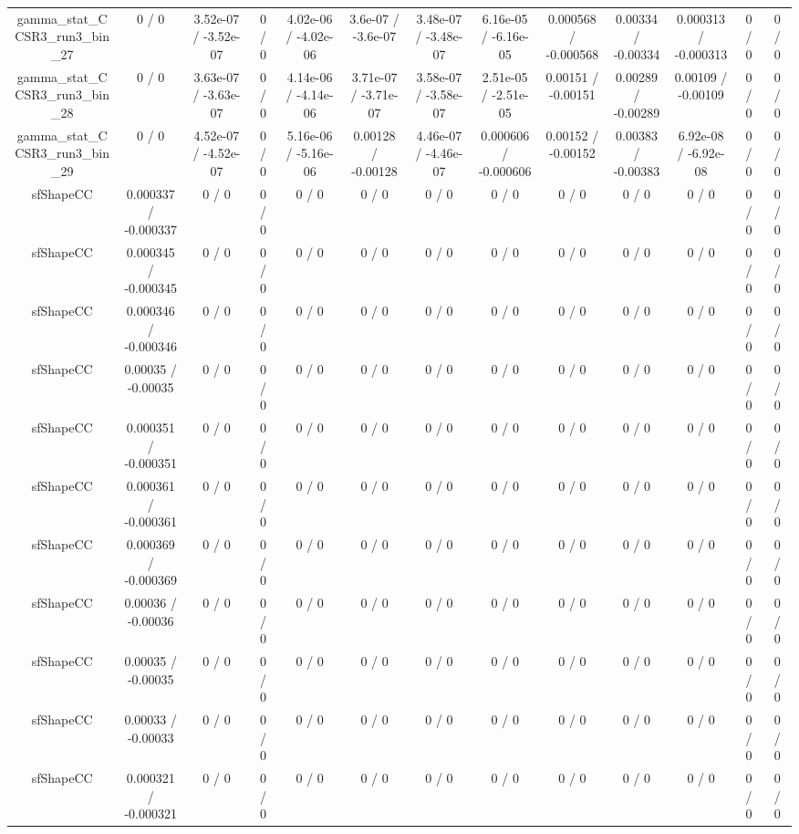 \documentclass[10pt]{article}
\begin{document}
\begin{table}[htbp]
\begin{center}
\begin{tabular}{|c|c|c|c|c|c|c|c|c|c|c|c|c|}
  gamma_stat_CCSR3_run3_bin_27 & 0 / 0 & 3.52e-07 / -3.52e-07 & 0 / 0 & 4.02e-06 / -4.02e-06 & 3.6e-07 / -3.6e-07 & 3.48e-07 / -3.48e-07 & 6.16e-05 / -6.16e-05 & 0.000568 / -0.000568 & 0.00334 / -0.00334 & 0.000313 / -0.000313 & 0 / 0 & 0 / 0 \\ 
  gamma_stat_CCSR3_run3_bin_28 & 0 / 0 & 3.63e-07 / -3.63e-07 & 0 / 0 & 4.14e-06 / -4.14e-06 & 3.71e-07 / -3.71e-07 & 3.58e-07 / -3.58e-07 & 2.51e-05 / -2.51e-05 & 0.00151 / -0.00151 & 0.00289 / -0.00289 & 0.00109 / -0.00109 & 0 / 0 & 0 / 0 \\ 
  gamma_stat_CCSR3_run3_bin_29 & 0 / 0 & 4.52e-07 / -4.52e-07 & 0 / 0 & 5.16e-06 / -5.16e-06 & 0.00128 / -0.00128 & 4.46e-07 / -4.46e-07 & 0.000606 / -0.000606 & 0.00152 / -0.00152 & 0.00383 / -0.00383 & 6.92e-08 / -6.92e-08 & 0 / 0 & 0 / 0 \\ 
  sfShapeCC & 0.000337 / -0.000337 & 0 / 0 & 0 / 0 & 0 / 0 & 0 / 0 & 0 / 0 & 0 / 0 & 0 / 0 & 0 / 0 & 0 / 0 & 0 / 0 & 0 / 0 \\ 
  sfShapeCC & 0.000345 / -0.000345 & 0 / 0 & 0 / 0 & 0 / 0 & 0 / 0 & 0 / 0 & 0 / 0 & 0 / 0 & 0 / 0 & 0 / 0 & 0 / 0 & 0 / 0 \\ 
  sfShapeCC & 0.000346 / -0.000346 & 0 / 0 & 0 / 0 & 0 / 0 & 0 / 0 & 0 / 0 & 0 / 0 & 0 / 0 & 0 / 0 & 0 / 0 & 0 / 0 & 0 / 0 \\ 
  sfShapeCC & 0.00035 / -0.00035 & 0 / 0 & 0 / 0 & 0 / 0 & 0 / 0 & 0 / 0 & 0 / 0 & 0 / 0 & 0 / 0 & 0 / 0 & 0 / 0 & 0 / 0 \\ 
  sfShapeCC & 0.000351 / -0.000351 & 0 / 0 & 0 / 0 & 0 / 0 & 0 / 0 & 0 / 0 & 0 / 0 & 0 / 0 & 0 / 0 & 0 / 0 & 0 / 0 & 0 / 0 \\ 
  sfShapeCC & 0.000361 / -0.000361 & 0 / 0 & 0 / 0 & 0 / 0 & 0 / 0 & 0 / 0 & 0 / 0 & 0 / 0 & 0 / 0 & 0 / 0 & 0 / 0 & 0 / 0 \\ 
  sfShapeCC & 0.000369 / -0.000369 & 0 / 0 & 0 / 0 & 0 / 0 & 0 / 0 & 0 / 0 & 0 / 0 & 0 / 0 & 0 / 0 & 0 / 0 & 0 / 0 & 0 / 0 \\ 
  sfShapeCC & 0.00036 / -0.00036 & 0 / 0 & 0 / 0 & 0 / 0 & 0 / 0 & 0 / 0 & 0 / 0 & 0 / 0 & 0 / 0 & 0 / 0 & 0 / 0 & 0 / 0 \\ 
  sfShapeCC & 0.00035 / -0.00035 & 0 / 0 & 0 / 0 & 0 / 0 & 0 / 0 & 0 / 0 & 0 / 0 & 0 / 0 & 0 / 0 & 0 / 0 & 0 / 0 & 0 / 0 \\ 
  sfShapeCC & 0.00033 / -0.00033 & 0 / 0 & 0 / 0 & 0 / 0 & 0 / 0 & 0 / 0 & 0 / 0 & 0 / 0 & 0 / 0 & 0 / 0 & 0 / 0 & 0 / 0 \\ 
  sfShapeCC & 0.000321 / -0.000321 & 0 / 0 & 0 / 0 & 0 / 0 & 0 / 0 & 0 / 0 & 0 / 0 & 0 / 0 & 0 / 0 & 0 / 0 & 0 / 0 & 0 / 0 \\ 

\end{tabular}
\end{center}
\end{table}
\end{document}
